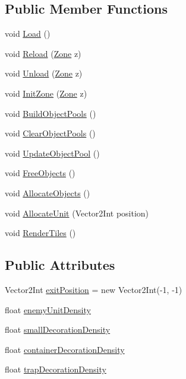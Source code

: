 \subsection*{Public Member Functions}
\begin{DoxyCompactItemize}
\item 
void \mbox{\hyperlink{class_dungeon_manager_ac2c0ce668813e7b0a34b935364a5650f}{Load}} ()
\item 
void \mbox{\hyperlink{class_dungeon_manager_af5da9360e25192d468c5e8461ff19f20}{Reload}} (\mbox{\hyperlink{class_dungeon_manager_a6558d4a01889674bf25c798f1b90a431}{Zone}} z)
\item 
void \mbox{\hyperlink{class_dungeon_manager_a010c39db85d745cd24e4e960d248ab4a}{Unload}} (\mbox{\hyperlink{class_dungeon_manager_a6558d4a01889674bf25c798f1b90a431}{Zone}} z)
\item 
void \mbox{\hyperlink{class_dungeon_manager_afc7ff9dc122b876f72a4f238496f3a26}{Init\+Zone}} (\mbox{\hyperlink{class_dungeon_manager_a6558d4a01889674bf25c798f1b90a431}{Zone}} z)
\item 
void \mbox{\hyperlink{class_dungeon_manager_a5a401d26555b3eff094668620d4857ca}{Build\+Object\+Pools}} ()
\item 
void \mbox{\hyperlink{class_dungeon_manager_a693d00ae1ca65d58dab634deaa9cfec9}{Clear\+Object\+Pools}} ()
\item 
void \mbox{\hyperlink{class_dungeon_manager_a980762c66ae4ae92ce3d8caa42f7fe61}{Update\+Object\+Pool}} ()
\item 
void \mbox{\hyperlink{class_dungeon_manager_ab7edf3b19e13892178a34ece10f4c5d5}{Free\+Objects}} ()
\item 
void \mbox{\hyperlink{class_dungeon_manager_a196f2f6754dae0d38307197bbbf033c4}{Allocate\+Objects}} ()
\item 
void \mbox{\hyperlink{class_dungeon_manager_a384a7907b2dba3017c3b4870c089e3ff}{Allocate\+Unit}} (Vector2\+Int position)
\item 
void \mbox{\hyperlink{class_dungeon_manager_a89bde2dbae3ffb1dd89635df4a8df153}{Render\+Tiles}} ()
\end{DoxyCompactItemize}
\subsection*{Public Attributes}
\begin{DoxyCompactItemize}
\item 
Vector2\+Int \mbox{\hyperlink{class_dungeon_manager_aadb66fc96231fe5b03f36fe52d602d23}{exit\+Position}} = new Vector2\+Int(-\/1, -\/1)
\item 
float \mbox{\hyperlink{class_dungeon_manager_a5c9f7b979abf6f84f53207534b4411fd}{enemy\+Unit\+Density}}
\item 
float \mbox{\hyperlink{class_dungeon_manager_ae78f0aa119dcc211708cf8f3424534a6}{small\+Decoration\+Density}}
\item 
float \mbox{\hyperlink{class_dungeon_manager_ac8121ec063d2906a27e427909dda7b98}{container\+Decoration\+Density}}
\item 
float \mbox{\hyperlink{class_dungeon_manager_afe07ede1aa21fca0021660f0c0b1a536}{trap\+Decoration\+Density}}
\end{DoxyCompactItemize}
